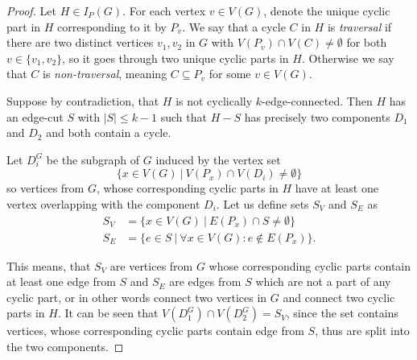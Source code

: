 \documentclass[12pt, twoside]{book}
\begin{document}
\begin{proof}
	Let $H\in I_P(G)$. For each vertex $v\in V(G)$, denote the unique cyclic part in $H$ corresponding to it by $P_v$. We say that a cycle $C$ in $H$ is \textit{traversal} if there are two distinct vertices $v_1,v_2$ in $G$ with $V(P_v)\cap V(C)\neq \emptyset$ for both $v\in\{v_1,v_2\}$, so it goes through two unique cyclic parts in $H$. Otherwise we say that $C$ is \textit{non-traversal}, meaning $C\subseteq P_v$ for some $v\in V(G)$.
	
	Suppose by contradiction, that $H$ is not cyclically $k$-edge-connected. Then $H$ has an edge-cut $S$ with $|S|\leq k-1$ such that $H-S$ has precisely two components $D_1$ and $D_2$ and both contain a cycle.
	
	Let $D_i^G$ be the subgraph of $G$ induced by the vertex set $$\{x\in V(G)~|~ V(P_x)\cap V(D_i)\neq \emptyset\}$$
	so vertices from $G$, whose corresponding cyclic parts in $H$ have at least one vertex overlapping with the component $D_i$. Let us define sets $S_V$ and $S_E$ as
	\begin{align*}
		S_V &= \{x\in V(G) ~|~ E(P_x)\cap S\neq \emptyset\} \\
		S_E &= \{e\in S ~|~ \forall x\in V(G): e\notin E(P_x) \}.
	\end{align*}
	
	This means, that $S_V$ are vertices from $G$ whose corresponding cyclic parts contain at least one edge from $S$ and $S_E$ are edges from $S$ which are not a part of any cyclic part, or in other words connect two vertices in $G$ and connect two cyclic parts in $H$. It can be seen that ${V(D_1^G)\cap V(D_2^G)=S_V}$, since the set contains vertices, whose corresponding cyclic parts contain edge from $S$, thus are split into the two components.
	

\end{proof}
\end{document}
